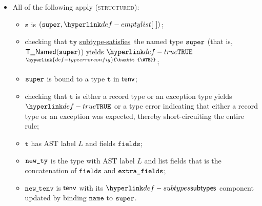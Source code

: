 \documentclass{book}
\newcommand\TypeErrorConfig[0]{\hyperlink{def-typeerrorconfig}{\texttt{\#TE}}}
\newcommand\ProseOrTypeError[0]{\hyperlink{def-proseortypeerror}{$^{\TypeErrorConfig}$}}
\newcommand\subtypesatisfies[0]{\hyperlink{def-subtypesatisfies}{subtype-satisfies}}
\newcommand\newtenv[0]{\texttt{new\_tenv}}
\newcommand\vt[0]{\texttt{t}}
\newcommand\vs[0]{\texttt{s}}
\newcommand\tty[0]{\texttt{ty}}
\newcommand\fields[0]{\texttt{fields}}
\newcommand\name[0]{\texttt{name}}
\begin{document}
\begin{itemize}
  \item All of the following apply (\textsc{structured}):
  \begin{itemize}
    \item $\vs$ is $(\vsuper, \emptylist)$;
    \item checking that $\tty$ \subtypesatisfies\ the named type $\texttt{super}$ (that is,\\ $\textsf{T\_Named}(\texttt{super})$) yields
          $\True$ \ProseOrTypeError;
    \item $\texttt{super}$ is bound to a type $\vt$ in $\textsf{tenv}$;
    \item checking that $\vt$ is either a record type or an exception type yields $\True$ or a type error
          indicating that either a record type or an exception was expected, thereby short-circuiting the entire rule;
    \item $\vt$ has AST label $L$ and fields $\fields$;
    \item $\texttt{new\_ty}$ is the type with AST label $L$ and list fields that is the concatenation of $\fields$ and $\texttt{extra\_fields}$;
    \item $\newtenv$ is $\textsf{tenv}$ with its $\subtypes$ component updated by binding $\name$ to $\texttt{super}$.
  \end{itemize}
\end{itemize}
\end{document}
